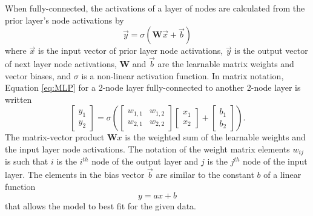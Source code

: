 
When fully-connected, the activations of a layer of nodes are calculated from the prior layer's node activations by
\begin{equation} \label{eq:MLP}
	\vec{y} = \sigma \left(\textbf{W}\vec{x} + \vec{b}\right)
\end{equation}
where $\vec{x}$ is the input vector of prior layer node activations, $\vec{y}$ is the output vector of next layer node activations, $\textbf{W}$ and $\vec{b}$ are the learnable matrix weights and vector biases, and $\sigma$ is a non-linear activation function. In matrix notation, Equation \ref{eq:MLP} for a 2-node layer fully-connected to another 2-node layer is written
\begin{equation} \label{eq:MLP_matrix}
	\begin{bmatrix}
		y_{1} \\
		y_{2}
	\end{bmatrix}
	= \sigma \left(
	\begin{bmatrix}
		w_{1,1} & w_{1,2} \\
		w_{2,1} & w_{2,2}
	\end{bmatrix}
	\begin{bmatrix}
		x_{1} \\
		x_{2}
	\end{bmatrix}
	+
	\begin{bmatrix}
		b_{1} \\
		b_{2}
	\end{bmatrix}
	\right).
\end{equation}
The matrix-vector product $\textbf{W}x$ is the weighted sum of the learnable weights and the input layer node activations. The notation of the weight matrix elements $w_{ij}$ is such that $i$ is the $i^{th}$ node of the output layer and $j$ is the $j^{th}$ node of the input layer. The elements in the bias vector $\vec{b}$ are similar to the constant $b$ of a linear function
\[
y = ax + b
\]
that allows the model to best fit for the given data.

